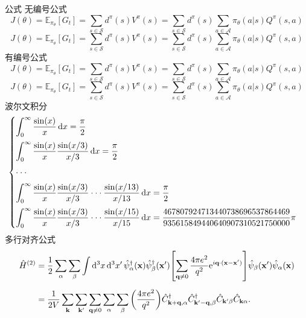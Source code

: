 \documentclass[dvipsnames, svgnames,a4paper,11pt]{article}
\begin{document}
\begin{tbox}{公式}
	无编号公式
    \begin{equation*}
        J(\theta) = \mathbb{E}_{\pi_\theta}[G_t] = \sum_{s\in\mathcal{S}} d^\pi (s)V^\pi(s)=\sum_{s\in\mathcal{S}} d^\pi(s)\sum_{a\in\mathcal{A}}\pi_\theta(a|s)Q^\pi(s,a)
    \end{equation*}
$$ J(\theta) = \mathbb{E}_{\pi_\theta}[G_t] = \sum_{s\in\mathcal{S}} d^\pi (s)V^\pi(s)=\sum_{s\in\mathcal{S}} d^\pi(s)\sum_{a\in\mathcal{A}}\pi_\theta(a|s)Q^\pi(s,a) $$
    有编号公式
    \begin{equation}
        J(\theta) = \mathbb{E}_{\pi_\theta}[G_t] = \sum_{s\in\mathcal{S}} d^\pi (s)V^\pi(s)=\sum_{s\in\mathcal{S}} d^\pi(s)\sum_{a\in\mathcal{A}}\pi_\theta(a|s)Q^\pi(s,a)
    \end{equation}
    \begin{equation}
        J(\theta) = \mathbb{E}_{\pi_\theta}[G_t] = \sum_{s\in\mathcal{S}} d^\pi (s)V^\pi(s)=\sum_{s\in\mathcal{S}} d^\pi(s)\sum_{a\in\mathcal{A}}\pi_\theta(a|s)Q^\pi(s,a)
    \end{equation}
	波尔文积分
    \[
    \begin{cases}
        \vspace{0.2cm}
        \displaystyle{\int_{0}^{\infty} \frac{\sin(x)}{x}\dd{x} = \frac{\pi}{2}}\\
        \vspace{0.2cm}
        \displaystyle{\int_{0}^{\infty} \frac{\sin(x)}{x} \frac{\sin(x/3)}{x/3}\dd{x} = \frac{\pi}{2}} \\
        \vspace{0.2cm}\cdot\cdot\cdot\\
        \vspace{0.2cm}
        \displaystyle{\int_{0}^{\infty} \frac{\sin(x)}{x} \frac{\sin(x/3)}{x/3} \cdot\cdot\cdot \frac{\sin(x/13)}{x/13}\dd{x} = \frac{\pi}{2}}\\
        \displaystyle{\int_{0}^{\infty} \frac{\sin(x)}{x} \frac{\sin(x/3)}{x/3} \cdot\cdot\cdot \frac{\sin(x/15)}{x/15}\dd{x} = \frac{467807924713440738696537864469}{935615849440640907310521750000}\pi}
    \end{cases}  
    \]
	多行对齐公式
	\begin{align*} 
		\hat{H}^{(2)} &= \frac{1}{2}\sum_{\alpha}\sum_{\beta}\int \dd[3]{x}\dd[3]{x'} \hat{\psi}^\dagger_\alpha(\vb{x})\hat{\psi}_\beta^\dagger(\vb{x}')\qty[\sum_{\vb{q}\neq 0} \frac{4\pi e^2}{q^2}\mathrm{e}^{i\vb{q}\cdot(\vb{x}-\vb{x}')}]\hat{\psi}_{\beta}(\vb{x}')\hat{\psi}_\alpha(\vb{x})\\[.2cm]
		&=\frac{1}{2V}\sum_{\vb{k}}\sum_{\vb{k}'}\sum_{\vb{q}\neq 0}\sum_{\alpha}\sum_{\beta}\qty(\frac{4\pi e^2}{q^2})\hat{C}_{\vb{k}+\vb{q},\alpha}^\dagger\hat{C}_{\vb{k}'-\vb{q},\beta}^\dagger\hat{C}_{\vb{k}'\beta}\hat{C}_{\vb{k}\alpha}. 
	\end{align*}
\end{tbox}
\end{document}
